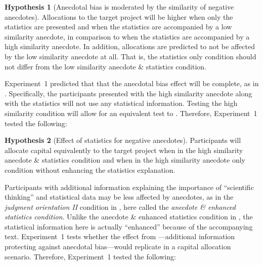 \documentclass[a4paper, nobind, dvipsnames]{templates/ociamthesis}
\theoremstyle{definition}
\theoremstyle{definition}
\theoremstyle{definition}
\theoremstyle{definition}
\newtheorem{hypothesis}{Hypothesis}[chapter]
\theoremstyle{remark}
\begin{document}
\begin{hypothesis}[Anecdotal bias is moderated by the similarity of negative anecdotes]
\protect\hypertarget{hyp:anecdote-similarity-anecdotes-1}{}{\label{hyp:anecdote-similarity-anecdotes-1} {} }Allocations to the target project will be higher when only the statistics are
presented and when the statistics are accompanied by a low similarity anecdote,
in comparison to when the statistics are accompanied by a high similarity
anecdote. In addition, allocations are predicted to not be affected by the low
similarity anecdote at all. That is, the statistics only condition should not
differ from the low similarity anecdote \& statistics condition.
\end{hypothesis}

Experiment~1 predicted that that the anecdotal bias effect will be complete, as
in \textcite{wainberg2013}. Specifically, the participants presented with the high
similarity anecdote along with the statistics will not use any statistical
information. Testing the high similarity condition will allow for an equivalent
test to \textcite{wainberg2013}. Therefore, Experiment~1 tested the following:

\begin{hypothesis}[Effect of statistics for negative anecdotes]
\protect\hypertarget{hyp:statistics-anecdotes-1}{}{\label{hyp:statistics-anecdotes-1} {} }Participants will allocate capital equivalently to the target project when in
the high similarity anecdote \& statistics condition and when in the high
similarity anecdote only condition without enhancing the statistics explanation.
\end{hypothesis}

Participants with additional information explaining the importance of
``scientific thinking'' and statistical data may be less affected by anecdotes, as
in the \emph{judgment orientation II} condition in \textcite{wainberg2018}, here called the
\emph{anecdote \& enhanced statistics condition}. Unlike the anecdote \& enhanced
statistics condition in \textcite{wainberg2013}, the statistical information here is
actually ``enhanced'' because of the accompanying text. Experiment~1 tests whether
the effect from \textcite{wainberg2018}---additional information protecting against
anecdotal bias---would replicate in a capital allocation scenario. Therefore,
Experiment~1 tested the following:
\end{document}
